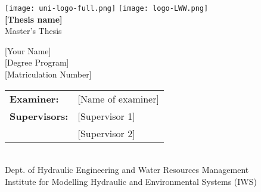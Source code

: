
\begin{titlepage}
	\begin{center}
	\texttt{[image: uni-logo-full.png]}\hspace*{6cm} %
	\texttt{[image: logo-LWW.png]}\\
		\vspace{3cm} 
		\Huge\textbf{[Thesis name]}\\
		\vspace{1.5cm}
		\Large Master's Thesis %
		
		\vspace{1.5cm}
		\large [Your Name]\\
		\large [Degree Program]\\ %
		\vspace{2cm}
		\large [Matriculation Number] \\
		\Large \date{\today}
	\end{center}
	\vfill
	\begin{tabular}{ll}
		\textbf{Examiner:} & [Name of examiner] \\
		\textbf{Supervisors:} & [Supervisor 1] \\ & [Supervisor 2]
	\end{tabular}\vspace{0.25cm} \\
	\large Dept. of Hydraulic Engineering and Water Resources Management\\	
	\large Institute for Modelling Hydraulic and Environmental Systems (IWS)
\end{titlepage}
		
